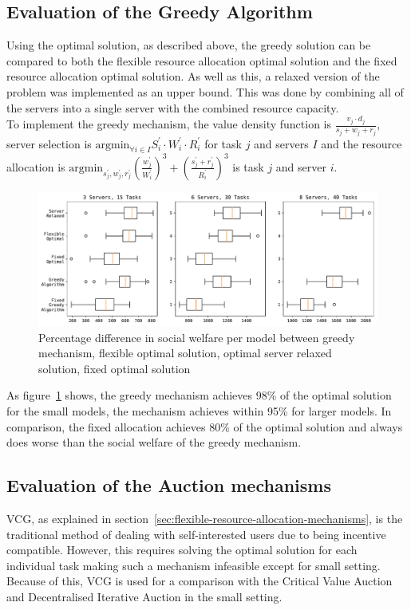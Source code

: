 \subsection{Evaluation of the Greedy Algorithm}
\label{subsec:evaluation-of-the-greedy-algorithm}
Using the optimal solution, as described above, the greedy solution can be compared to both the flexible resource
allocation optimal solution and the fixed resource allocation optimal solution. As well as this, a
relaxed version of the problem was implemented as an upper bound. This was done by combining all of the servers into
a single server with the combined resource capacity. \\
To implement the greedy mechanism, the value density function is $\frac{v_j \cdot d_j}{s_j + w_j + r_j}$, server selection
is $\text{argmin}_{\forall i \in I} S^{'}_i \cdot W^{'}_i \cdot R^{'}_i$ for task $j$ and servers $I$ and the resource allocation is
$\text{argmin}_{s^{'}_j, w^{'}_j, r^{'}_j} \left(\frac{w^{'}_j}{W^{'}_i}\right)^3 + \left(\frac{s^{'}_j + r^{'}_j}{R^{'}_i}\right)^3$
is task $j$ and server $i$.

\begin{figure}
    \centering
    \includegraphics[width=\linewidth]{figs/greedy/multi_setting_social_welfare.pdf}
    \caption{Percentage difference in social welfare per model between greedy mechanism, flexible optimal solution,
             optimal server relaxed solution, fixed optimal solution}
    \label{fig:greedy-mechanism-comparison}
\end{figure}
As figure~\ref{fig:greedy-mechanism-comparison} shows, the greedy mechanism achieves 98\% of the optimal solution for
the small models, the mechanism achieves within 95\% for larger models. In comparison, the fixed allocation achieves
80\% of the optimal solution and always does worse than the social welfare of the greedy mechanism.

\subsection{Evaluation of the Auction mechanisms}\label{subsec:evaluation-of-the-auction-mechanisms}
VCG, as explained in section~\ref{sec:flexible-resource-allocation-mechanisms}, is the traditional method of dealing
with self-interested users due to being incentive compatible. However, this requires solving the optimal solution
for each individual task making such a mechanism infeasible except for small setting. Because of this, VCG is used for
a comparison with the Critical Value Auction and Decentralised Iterative Auction in the small setting.

